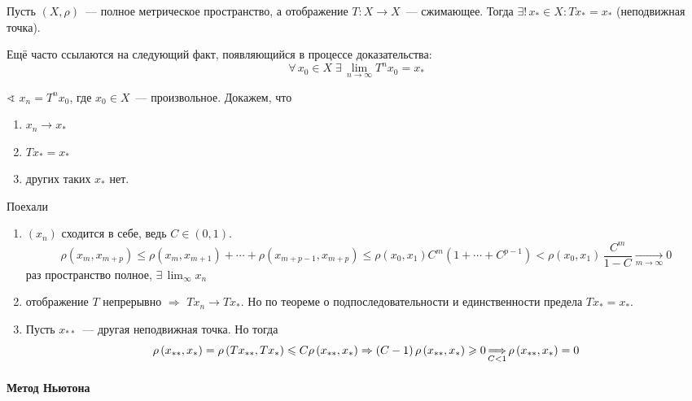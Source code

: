 \documentclass[12pt,timbord]{../../../notes}
\begin{document}
\begin{thrm}[Банах]\label{thrm:diffspace::contrmap::banach}
  Пусть $(X, \rho)$~--- полное метрическое пространство, а отображение $T\colon X \to X$~--- сжимающее.
  Тогда $\exists!\, x_* \in X \colon Tx_* = x_*$ (неподвижная точка).

  Ещё часто ссылаются на следующий факт, появляющийся в процессе доказательства:
  \[
    \forall\, x_0 \in X \; \exists\, \lim_{n\to \infty} T^n x_0 = x_*
  \]
\end{thrm}
\begin{ittproof}
  $\sphericalangle$ $x_n = T^n x_0$, где $x_0\in X$~--- произвольное. Докажем, что 
  \begin{enumerate}
    \item $x_n \to x_*$
    \item $T x_* = x_*$
    \item других таких $x_*$ нет.
  \end{enumerate}

  Поехали
  \begin{enumerate}
    \item $(x_n)$ сходится в себе, ведь $C\in (0,1)$.
      \[
        \rho(x_m, x_{m+p}) \leqslant \rho(x_m, x_{m+1}) + \dotsb + \rho(x_{m+p-1}, x_{m+p})
        \leqslant \rho(x_0, x_1) C^m (1 + \dotsb + C^{p-1})
          < \rho(x_0, x_1)\,\frac{C^m}{1-C} \xrightarrow[m\to \infty]{} 0
      \]
      раз пространство полное, $\exists\, \lim_{\infty} x_n$
    \item отображение $T$ непрерывно $ \Rightarrow $ $T x_n \to T x_*$. Но по теореме о
      подпоследовательности и единственности предела $T x_* = x_*$.
    \item Пусть $x_{**}$~--- другая неподвижная точка. Но тогда 
      \[
        \rho \left( x_{\ast \ast} , x_{\ast} \right) = \rho \left( T x_{\ast
        \ast} ,T x_{\ast} \right) \leqslant C \rho \left( x_{\ast \ast} ,
        x_{\ast} \right) \Rightarrow \left( C - 1 \right) \rho \left( x_{\ast \ast}
        , x_{\ast} \right) \geqslant 0 \xRightarrow[C < 1]{} \rho \left( x_{\ast
        \ast} , x_{\ast} \right) = 0 
      \]
  \end{enumerate}

\end{ittproof}

\paragraph{Метод Ньютона}
\label{par:diffspace::newtfindroot}
\end{document}
